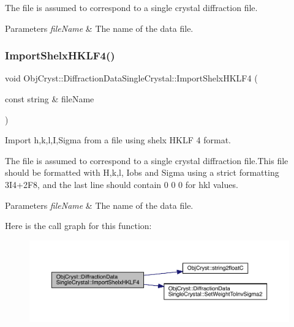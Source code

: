 The file is assumed to correspond to a single crystal diffraction file. 
\begin{DoxyParams}{Parameters}
{\em file\+Name} & The name of the data file. \\
\hline
\end{DoxyParams}
\mbox{\label{class_obj_cryst_1_1_diffraction_data_single_crystal_a7cb0c6ef5e877e582baf5eb8133e2199}} 
\subsubsection{\texorpdfstring{ImportShelxHKLF4()}{ImportShelxHKLF4()}}
{\footnotesize\ttfamily void Obj\+Cryst\+::\+Diffraction\+Data\+Single\+Crystal\+::\+Import\+Shelx\+H\+K\+L\+F4 (\begin{DoxyParamCaption}\item[{const string \&}]{file\+Name }\end{DoxyParamCaption})}



Import h,k,l,I,Sigma from a file using shelx H\+K\+LF 4 format. 

The file is assumed to correspond to a single crystal diffraction file.\+This file should be formatted with H,k,l, Iobs and Sigma using a strict formatting 3I4+2\+F8, and the last line should contain 0 0 0 for hkl values. 
\begin{DoxyParams}{Parameters}
{\em file\+Name} & The name of the data file. \\
\hline
\end{DoxyParams}
Here is the call graph for this function\+:
\nopagebreak
\begin{figure}[H]
\begin{center}
\leavevmode
\includegraphics[width=350pt]{class_obj_cryst_1_1_diffraction_data_single_crystal_a7cb0c6ef5e877e582baf5eb8133e2199_cgraph}
\end{center}
\end{figure}
\mbox{\label{class_obj_cryst_1_1_diffraction_data_single_crystal_ab11d02b972bd40e6fc024d0e8ed4f1a1}} 
